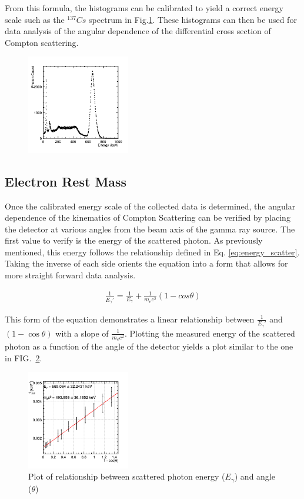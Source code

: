\documentclass[%
 reprint,
 amsmath,amssymb,
 aps,
 pra,
]{revtex4-1}
\begin{document}
From this formula, the histograms can be calibrated to yield a correct energy scale such as the $^{137}Cs$ spectrum in Fig.\ref{Fig:CsCalib}. These histograms can then be used for data analysis of the angular dependence of the differential cross section of Compton scattering.
\begin{figure}[H]
\centering	
	\includegraphics[width=0.4\textwidth]{CsCalibFullSpec.png}
	\caption{}
	\label{Fig:CsCalib}
\end{figure}

\subsection{Electron Rest Mass}

Once the calibrated energy scale of the collected data is determined, the angular dependence of the kinematics of Compton Scattering can be verified by placing the detector at various angles from the beam axis of the gamma ray source. The first value to verify is the energy of the scattered photon. As previously mentioned, this energy follows the relationship defined in Eq. \ref{eq:energy_scatter}. Taking the inverse of each side orients the equation into a form that allows for more straight forward data analysis.

\begin{gather*}\label{eq:energy_scatter2}
	\frac{1}{E_\gamma '} = \frac{1}{E_\gamma} + \frac{1}{m_{e}c^{2}}(1 - cos\theta)
\end{gather*}

This form of the equation demonstrates a linear relationship between $\frac{1}{E_\gamma '}$ and $(1 - \cos\theta)$ with a slope of $\frac{1}{m_{e}c^{2}}$. Plotting the measured energy of the scattered photon as a function of the angle of the detector yields a plot similar to the one in FIG.~\ref{Fig:EScatFit}.

\begin{figure}[H]
\centering	
	\includegraphics[width=0.4\textwidth]{EScatvTheta.png}
	\caption{Plot of relationship between scattered photon energy ($E_\gamma$) and angle ($\theta$)}
	\label{Fig:EScatFit}
\end{figure}
\end{document}
